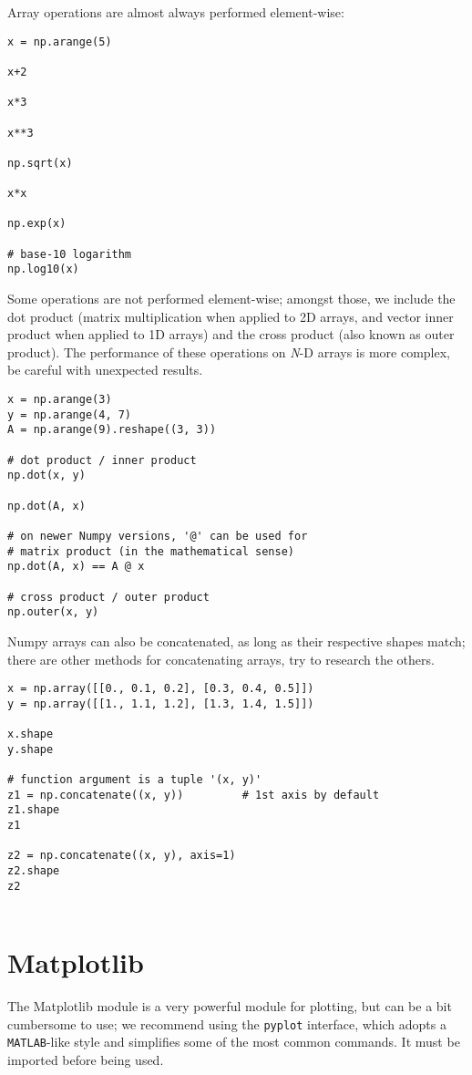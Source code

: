 Array operations are almost always performed element-wise:

\begin{lstlisting}[frame=single]
x = np.arange(5)

x+2

x*3

x**3

np.sqrt(x)

x*x

np.exp(x)

# base-10 logarithm
np.log10(x)
\end{lstlisting}

Some operations are not performed element-wise; amongst those, we include the dot product (matrix multiplication when applied to 2D arrays, and vector inner product when applied to 1D arrays) and the cross product (also known as outer product). The performance of these operations on \emph{N}-D arrays is more complex, be careful with unexpected results.

\begin{lstlisting}[frame=single]
x = np.arange(3)
y = np.arange(4, 7)
A = np.arange(9).reshape((3, 3))

# dot product / inner product
np.dot(x, y)

np.dot(A, x)

# on newer Numpy versions, '@' can be used for
# matrix product (in the mathematical sense)
np.dot(A, x) == A @ x

# cross product / outer product
np.outer(x, y)
\end{lstlisting}

Numpy arrays can also be concatenated, as long as their respective shapes match; there are other methods for concatenating arrays, try to research the others.

\begin{lstlisting}[frame=single]
x = np.array([[0., 0.1, 0.2], [0.3, 0.4, 0.5]])
y = np.array([[1., 1.1, 1.2], [1.3, 1.4, 1.5]])

x.shape
y.shape

# function argument is a tuple '(x, y)'
z1 = np.concatenate((x, y))			# 1st axis by default
z1.shape
z1

z2 = np.concatenate((x, y), axis=1)
z2.shape
z2


\end{lstlisting}

\section{Matplotlib}
The Matplotlib module is a very powerful module for plotting, but can be a bit cumbersome to use; we recommend using the {\tt pyplot} interface, which adopts a {\tt MATLAB}-like style and simplifies some of the most common commands. It must be imported before being used.

